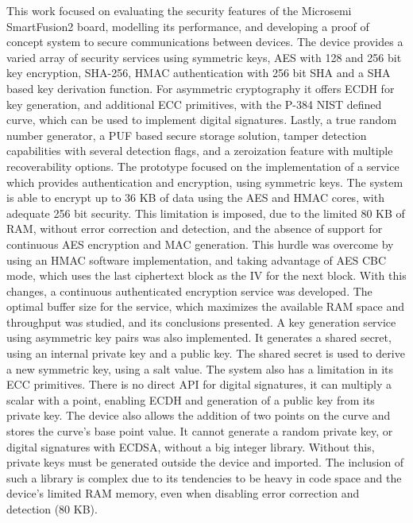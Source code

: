 \cleardoublepage
\label{chap:conclusion}

This work focused on evaluating the security features of the Microsemi SmartFusion2 board, modelling its performance, and developing a proof of concept system to secure communications between devices.
The device provides a varied array of security services using symmetric keys, AES with 128 and 256 bit key encryption, SHA-256, HMAC authentication with 256 bit SHA and a SHA based key derivation function. For asymmetric cryptography it offers ECDH for key generation, and additional ECC primitives, with the P-384 NIST defined curve, which can be used to implement digital signatures. Lastly, a true random number generator, a PUF based secure storage solution, tamper detection capabilities with several detection flags, and a zeroization feature with multiple recoverability options.
The prototype focused on the implementation of a service which provides authentication and encryption, using symmetric keys. The system is able to encrypt up to 36 KB of data using the AES and HMAC cores, with adequate 256 bit security. This limitation is imposed, due to the limited 80 KB of RAM, without error correction and detection, and the absence of support for continuous AES encryption and MAC generation. This hurdle was overcome by using an HMAC software implementation, and taking advantage of AES CBC mode, which uses the last ciphertext block as the IV for the next block. With this changes, a continuous authenticated encryption service was developed. The optimal buffer size for the service, which maximizes the available RAM space and throughput was studied, and its conclusions presented.
A key generation service using asymmetric key pairs was also implemented. It generates a shared secret, using an internal private key and a public key. The shared secret is used to derive a new symmetric key, using a salt value.
The system also has a limitation in its ECC primitives. There is no direct API for digital signatures, it can multiply a scalar with a point, enabling ECDH and generation of a public key from its private key. The device also allows the addition of two points on the curve and stores the curve's base point value. It cannot generate a random private key, or digital signatures with ECDSA, without a big integer library. Without this, private keys must be generated outside the device and imported. The inclusion of such a library is complex due to its tendencies to be heavy in code space and the device's limited RAM memory, even when disabling error correction and detection (80 KB). 
